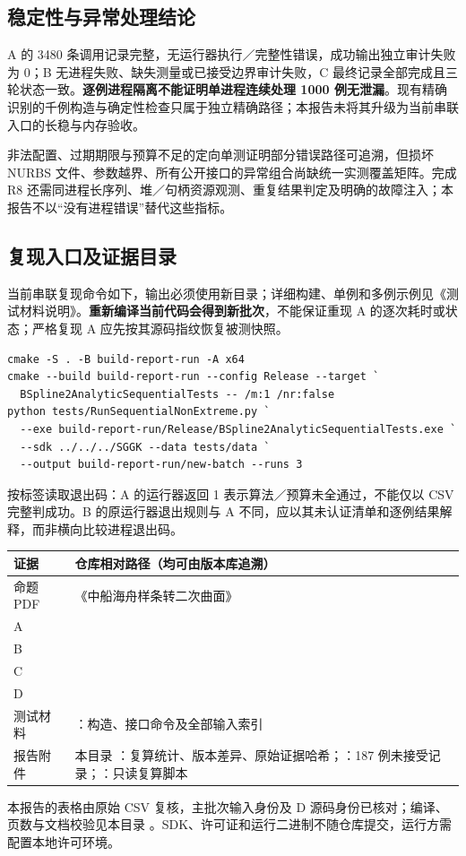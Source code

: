 \documentclass[UTF8,zihao=5,fontset=windows,a4paper]{ctexart}
\begin{document}
\subsection{稳定性与异常处理结论}
A 的 3480 条调用记录完整，无运行器执行／完整性错误，成功输出独立审计失败为 0；B 无进程失败、缺失测量或已接受边界审计失败，C 最终记录全部完成且三轮状态一致。\textbf{逐例进程隔离不能证明单进程连续处理 1000 例无泄漏}。现有精确识别的千例构造与确定性检查只属于独立精确路径；本报告未将其升级为当前串联入口的长稳与内存验收。

非法配置、过期期限与预算不足的定向单测证明部分错误路径可追溯，但损坏 NURBS 文件、参数越界、所有公开接口的异常组合尚缺统一实测覆盖矩阵。完成 R8 还需同进程长序列、堆／句柄资源观测、重复结果判定及明确的故障注入；本报告不以“没有进程错误”替代这些指标。

\subsection{复现入口及证据目录}
当前串联复现命令如下，输出必须使用新目录；详细构建、单例和多例示例见《测试材料说明》。\textbf{重新编译当前代码会得到新批次}，不能保证重现 A 的逐次耗时或状态；严格复现 A 应先按其源码指纹恢复被测快照。
\begin{lstlisting}
cmake -S . -B build-report-run -A x64
cmake --build build-report-run --config Release --target `
  BSpline2AnalyticSequentialTests -- /m:1 /nr:false
python tests/RunSequentialNonExtreme.py `
  --exe build-report-run/Release/BSpline2AnalyticSequentialTests.exe `
  --sdk ../../../SGGK --data tests/data `
  --output build-report-run/new-batch --runs 3
\end{lstlisting}
按标签读取退出码：A 的运行器返回 1 表示算法／预算未全通过，不能仅以 CSV 完整判成功。B 的原运行器退出规则与 A 不同，应以其未认证清单和逐例结果解释，而非横向比较进程退出码。

\begin{center}\small\renewcommand{\arraystretch}{1.15}
\begin{tabularx}{\linewidth}{@{}p{20mm}Y@{}}\toprule
证据 & 仓库相对路径（均可由版本库追溯）\\\midrule
命题 PDF & 《中船海舟样条转二次曲面》\\
A & \\
B & \\
C & \\
D & \\
测试材料 & ：构造、接口命令及全部输入索引\\
报告附件 & 本目录 ：复算统计、版本差异、原始证据哈希；：187 例未接受记录；：只读复算脚本\\\bottomrule
\end{tabularx}
\end{center}
本报告的表格由原始 CSV 复核，主批次输入身份及 D 源码身份已核对；编译、页数与文档校验见本目录 。SDK、许可证和运行二进制不随仓库提交，运行方需配置本地许可环境。
\end{document}

